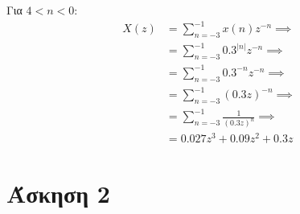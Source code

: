 \documentclass[12pt]{turabian-researchpaper}
\begin{document}
Για $ 4 < n < 0 $:
\begin{equation*}
    \begin{aligned}
        X(z) & = \sum_{n = -3}^{ -1 } x(n)z^{-n}              \implies \\
             & = \sum_{n = -3}^{ -1 } 0.3^{|n|} z^{-n}        \implies \\
             & = \sum_{n = -3}^{ -1 } 0.3^{-n} z^{-n}         \implies \\
             & = \sum_{n = -3}^{ -1 } (0.3 z)^{ -n }          \implies \\
             & = \sum_{n = -3}^{ -1 } \frac{ 1 }{ (0.3 z)^n } \implies \\
             & = 0.027 z^3 + 0.09 z^2 + 0.3 z
    \end{aligned}
\end{equation*}


\newpage\section{Άσκηση 2}
\end{document}

